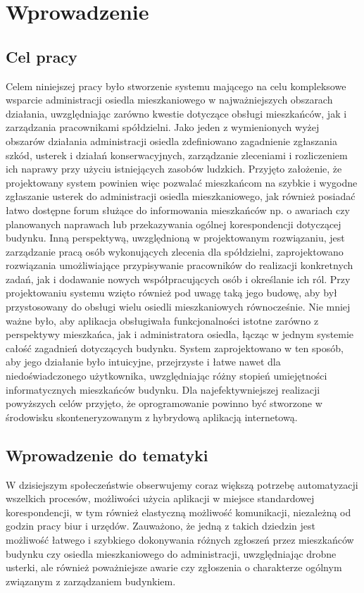 \newpage %
\section{Wprowadzenie}
\subsection{Cel pracy}
Celem niniejszej pracy było stworzenie systemu mającego na celu kompleksowe wsparcie administracji osiedla mieszkaniowego w najważniejszych obszarach działania, uwzględniając zarówno kwestie dotyczące obsługi mieszkańców, jak i zarządzania pracownikami spółdzielni. 
Jako jeden z wymienionych wyżej obszarów działania administracji osiedla zdefiniowano zagadnienie zgłaszania szkód, usterek i działań konserwacyjnych, zarządzanie zleceniami i rozliczeniem ich naprawy przy użyciu istniejących zasobów ludzkich. Przyjęto założenie, że projektowany system powinien więc pozwalać mieszkańcom na szybkie i wygodne zgłaszanie usterek do administracji osiedla mieszkaniowego, jak również  posiadać łatwo dostępne forum służące do informowania mieszkańców np. o awariach czy planowanych naprawach lub przekazywania ogólnej korespondencji dotyczącej budynku. 
Inną perspektywą, uwzględnioną w projektowanym rozwiązaniu, jest zarządzanie pracą osób wykonujących zlecenia dla spółdzielni, zaprojektowano rozwiązania umożliwiające przypisywanie pracowników do realizacji konkretnych zadań, jak i dodawanie nowych współpracujących osób i określanie ich ról. 
Przy projektowaniu systemu wzięto również pod uwagę taką jego budowę, aby  był przystosowany do obsługi wielu osiedli mieszkaniowych równocześnie. 
Nie mniej ważne było, aby aplikacja obsługiwała funkcjonalności istotne zarówno z perspektywy mieszkańca, jak i administratora osiedla, łącząc w jednym systemie całość zagadnień dotyczących budynku. 
System zaprojektowano w ten sposób, aby jego działanie było intuicyjne, przejrzyste i łatwe nawet dla niedoświadczonego użytkownika, uwzględniając różny stopień umiejętności informatycznych mieszkańców budynku.
Dla najefektywniejszej realizacji powyższych celów przyjęto, że oprogramowanie powinno być stworzone w środowisku skonteneryzowanym z hybrydową aplikacją internetową.
\subsection{Wprowadzenie do tematyki}
W dzisiejszym  społeczeństwie obserwujemy coraz większą potrzebę automatyzacji wszelkich procesów, możliwości użycia aplikacji w miejsce standardowej korespondencji, w tym również elastyczną możliwość komunikacji, niezależną od godzin pracy biur i urzędów. Zauważono, że jedną z takich dziedzin jest możliwość łatwego i szybkiego dokonywania różnych zgłoszeń przez mieszkańców budynku czy osiedla mieszkaniowego do administracji, uwzględniając drobne usterki, ale również poważniejsze awarie czy zgłoszenia o charakterze ogólnym związanym z zarządzaniem budynkiem. 

